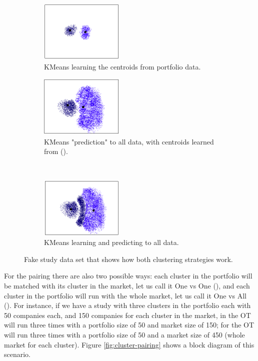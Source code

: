 \begin{figure}[!ht]
    \begin{subfigure}{.5\linewidth}
        \centering
        \includegraphics[width=4cm]{fig/ch3-cluster-strategy-port-fit.png}
        \caption{KMeans learning the centroids from portfolio data.}
        \label{fig:cluster-strategy:port-fit}
    \end{subfigure}
    \begin{subfigure}{.5\linewidth}
        \centering
        \includegraphics[width=4cm]{fig/ch3-cluster-strategy-port-predict.png}
        \caption{KMeans "prediction" to all data, with centroids learned from ().}
        \label{fig:cluster-strategy:port-predict}
    \end{subfigure}\\[1ex]
    \begin{subfigure}{\linewidth}
        \centering
        \includegraphics[width=4cm]{fig/ch3-cluster-strategy-all.png}
        \caption{KMeans learning and predicting to all data.}
        \label{fig:cluster-strategy:all}
    \end{subfigure}
    \caption{Fake study data set that shows how both clustering strategies work.}
    \label{fig:cluster-strategy}
\end{figure}

For the pairing there are also two possible ways: each cluster in the portfolio will be matched with its cluster in the market, let us call it One vs One (\nameClusterPairingA{}), and each cluster in the portfolio will run with the whole market, let us call it One vs All (\nameClusterPairingB{}). For instance, if we have a study with three clusters in the portfolio each with 50 companies each, and 150 companies for each cluster in the market, in \nameClusterPairingA{} the OT will run three times with a portfolio size of 50 and market size of 150; for \nameClusterPairingB{} the OT will run three times with a portfolio size of 50 and a market size of 450 (whole market for each cluster). Figure \ref{fig:cluster-pairing} shows a block diagram of this scenario.

